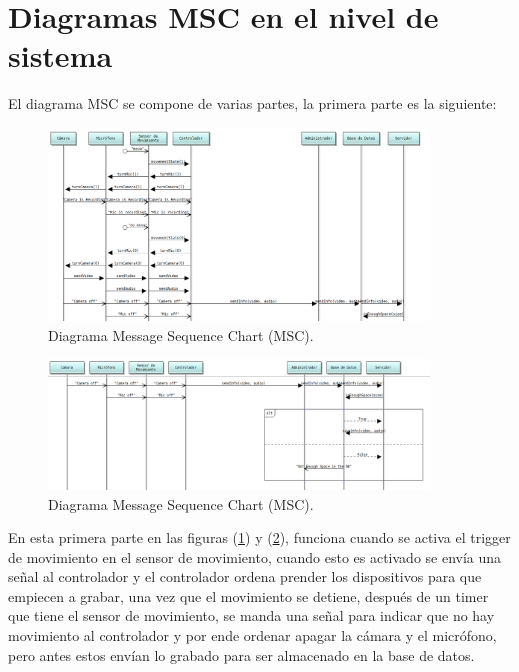 \section{Diagramas MSC en el nivel de sistema}

El diagrama MSC se compone de varias partes, la primera parte es la siguiente:

\begin{figure}[h]
    \centering
    \includegraphics[width=0.90\textwidth]{images/MSC1.png}
    \caption{Diagrama Message Sequence Chart (MSC).}
    \label{MSC1}
\end{figure}

\begin{figure}[h]
    \centering
    \includegraphics[width=0.90\textwidth]{images/MSC2.png}
    \caption{Diagrama Message Sequence Chart (MSC).}
    \label{MSC2}
\end{figure}

\pagebreak

En esta primera parte en las figuras (\ref{MSC1}) y (\ref{MSC2}), funciona cuando se activa el trigger de movimiento en el sensor de movimiento, cuando esto es activado se envía una señal al controlador y el controlador ordena prender los dispositivos para que empiecen a grabar, una vez que el movimiento se detiene, después de un timer que tiene el sensor de movimiento, se manda una señal para indicar que no hay movimiento al controlador y por ende ordenar apagar la cámara y el micrófono, pero antes estos envían lo grabado para ser almacenado en la base de datos.

